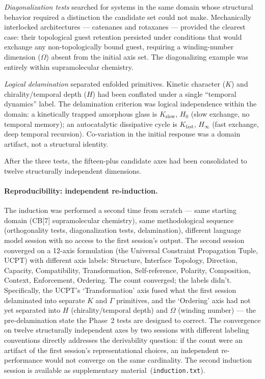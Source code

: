 \documentclass[12pt,a4paper]{article}
\begin{document}
\emph{Diagonalization tests} searched for systems in the same domain
whose structural behavior required a distinction the candidate set
could not make. Mechanically interlocked architectures --- catenanes
and rotaxanes --- provided the clearest case: their topological guest
retention persisted under conditions that would exchange any non-topologically
bound guest, requiring a winding-number dimension ($\Omega$) absent from
the initial axis set. The diagonalizing example was entirely within
supramolecular chemistry.

\emph{Logical delamination} separated enfolded primitives. Kinetic
character ($K$) and chirality/temporal depth ($H$) had been conflated
under a single ``temporal dynamics'' label. The delamination criterion
was logical independence within the domain: a kinetically trapped
amorphous glass is $K_{\text{slow}}$, $H_0$ (slow exchange, no temporal
memory); an autocatalytic dissipative cycle is $K_{\text{fast}}$,
$H_\infty$ (fast exchange, deep temporal recursion). Co-variation in
the initial response was a domain artifact, not a structural identity.

After the three tests, the fifteen-plus candidate axes had been
consolidated to twelve structurally independent dimensions.

\paragraph{Reproducibility: independent re-induction.}
The induction was performed a second time from scratch --- same
starting domain (CB[7] supramolecular chemistry), same methodological
sequence (orthogonality tests, diagonalization tests, delamination),
different language model session with no access to the first session's
output. The second session converged on a 12-axis formulation (the
Universal Constraint Propagation Tuple, UCPT) with different axis
labels: Structure, Interface Topology, Direction, Capacity,
Compatibility, Transformation, Self-reference, Polarity, Composition,
Context, Enforcement, Ordering. The count converged; the labels didn't.
Specifically, the UCPT's `Transformation' axis fused what the first
session delaminated into separate $K$ and $\Gamma$ primitives, and the
`Ordering' axis had not yet separated into $H$ (chirality/temporal
depth) and $\Omega$ (winding number) --- the pre-delamination state the
Phase~2 tests are designed to correct. The convergence on twelve
structurally independent axes by two sessions with different labeling
conventions directly addresses the derivability question: if the count
were an artifact of the first session's representational choices, an
independent re-performance would not converge on the same cardinality.
The second induction session is available as supplementary
material~(\texttt{induction.txt}).
\end{document}
